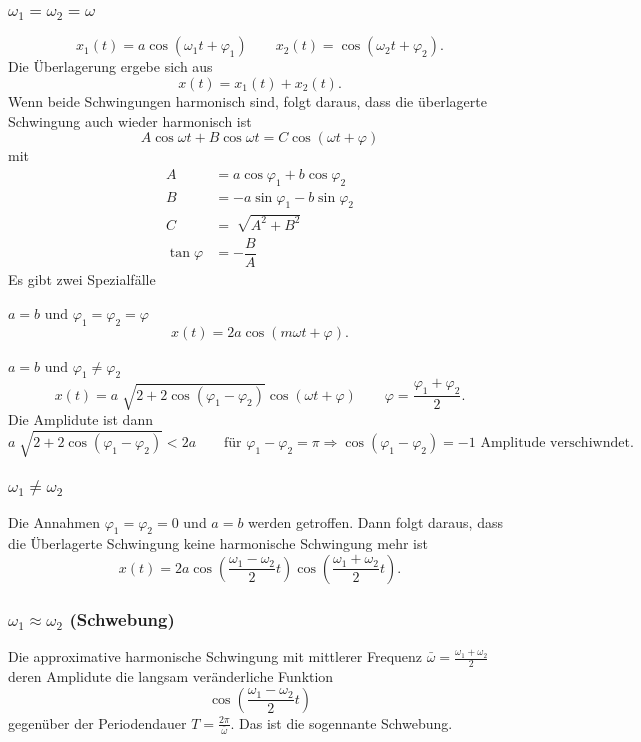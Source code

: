 \documentclass[a4paper,12pt]{article}
\begin{document}
\subsubsection{$\omega _1=\omega _2=\omega $}
\[ 
        x_1\left(t\right)=a\cos \left(\omega _1t+\varphi _1\right)\qquad x_2\left(t\right)=\cos \left(\omega _2t+\varphi _2\right)
.\] 
Die Überlagerung ergebe sich aus
\[ 
        x\left(t\right)=x_1\left(t\right)+x_2\left(t\right)
.\] 
Wenn beide Schwingungen harmonisch sind, folgt daraus, dass die überlagerte Schwingung auch wieder harmonisch ist
\[ 
        A\cos \omega t+B\cos \omega t=C\cos \left(\omega t+\varphi \right)
\] 
mit 
\begin{align*} %
        A&=a\cos \varphi _1+b\cos \varphi _2\\
        B&=-a\sin \varphi _1-b\sin \varphi _2\\
        C&=\sqrt[]{A^2+B^2}\\
        \tan \varphi &=-\dfrac{B}{A}
\end{align*}
Es gibt zwei Spezialfälle
\\\hfill\\\textbf{$a=b\text{ und }\varphi _1=\varphi _2=\varphi $}
\[ 
        x\left(t\right)=2a\cos \left(m\omega t+\varphi \right)
.\] 
\hfill\\\textbf{$a=b\text{ und }\varphi _1\neq \varphi _2$}
\[ 
        x\left(t\right)=a\sqrt[]{2+2\cos \left(\varphi _1-\varphi _2\right)}\cos \left(\omega t+\varphi \right)\qquad \varphi =\dfrac{\varphi _1+\varphi _2}{2}
.\] 
Die Amplidute ist dann
\[ 
        a\sqrt[]{2+2\cos \left(\varphi _1-\varphi _2\right)}<2a\qquad \text{für }\varphi _1-\varphi _2=\pi \Rightarrow \cos \left(\varphi _1-\varphi _2\right)=-1\text{ Amplitude verschiwndet}
.\] 

\subsubsection{$\omega _1\neq \omega _2$}
Die Annahmen $\varphi _1=\varphi _2=0$ und $a=b$ werden getroffen. Dann folgt daraus, dass die Überlagerte Schwingung keine harmonische Schwingung mehr ist
\[ 
        x\left(t\right)=2a\cos \left(\dfrac{\omega _1-\omega _2}{2}t\right)\cos \left(\dfrac{\omega _1+\omega _2}{2}t\right)
.\] 

\subsubsection{$\omega _1\approx \omega _2$ (Schwebung)}
Die approximative harmonische Schwingung mit mittlerer Frequenz $\bar{\omega }=\tfrac{\omega _1+\omega _2}{2}$ deren Amplidute die langsam veränderliche Funktion
\[ 
        \cos \left(\dfrac{\omega _1-\omega _2}{2}t\right)
\] 
gegenüber der Periodendauer $T=\tfrac{2\pi }{\bar{\omega }}$. Das ist die sogennante Schwebung.
\end{document}
